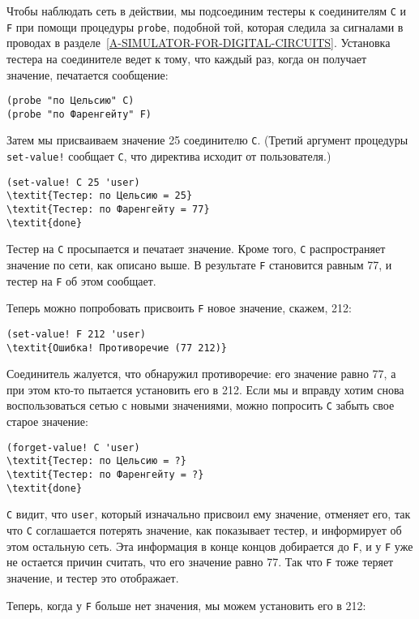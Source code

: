 Чтобы наблюдать сеть в действии, мы подсоединим тестеры к
соединителям {\tt C} и {\tt F} при помощи процедуры
{\tt probe}, подобной той, которая следила за сигналами в
проводах в разделе~\ref{A-SIMULATOR-FOR-DIGITAL-CIRCUITS}.
Установка тестера на соединителе ведет к тому, что каждый раз, когда
он получает значение, печатается сообщение:

\begin{Verbatim}[fontsize=\small]
(probe "по Цельсию" C)
(probe "по Фаренгейту" F)
\end{Verbatim}
Затем мы присваиваем значение 25 соединителю
{\tt C}. (Третий аргумент процедуры {\tt set-value!}
сообщает {\tt C}, что директива исходит от пользователя.)

\begin{Verbatim}[fontsize=\small]
(set-value! C 25 'user)
\textit{Тестер: по Цельсию = 25}
\textit{Тестер: по Фаренгейту = 77}
\textit{done}
\end{Verbatim}
Тестер на {\tt C} просыпается и печатает значение.  Кроме того,
{\tt C} распространяет значение по сети, как описано выше.  В
результате {\tt F} становится равным 77, и тестер на
{\tt F} об этом сообщает.

Теперь можно попробовать присвоить {\tt F} новое
значение, скажем, 212:

\begin{Verbatim}[fontsize=\small]
(set-value! F 212 'user)
\textit{Ошибка! Противоречие (77 212)}
\end{Verbatim}
Соединитель жалуется, что обнаружил противоречие: его значение равно
77, а при этом кто-то пытается установить его в 212.  Если мы и
вправду хотим снова воспользоваться сетью с новыми значениями, можно попросить
{\tt C} забыть свое старое значение:

\begin{Verbatim}[fontsize=\small]
(forget-value! C 'user)
\textit{Тестер: по Цельсию = ?}
\textit{Тестер: по Фаренгейту = ?}
\textit{done}
\end{Verbatim}
{\tt С} видит, что {\tt user}, который изначально
присвоил ему значение, отменяет его, так что {\tt C}
соглашается потерять значение, как показывает тестер, и информирует об
этом остальную сеть.  Эта информация в конце концов добирается до
{\tt F}, и у {\tt F} уже не остается причин считать, что
его значение равно 77.  Так что {\tt F} тоже теряет значение, и
тестер это отображает.

Теперь, когда у {\tt F} больше нет значения, мы
можем установить его в 212:

